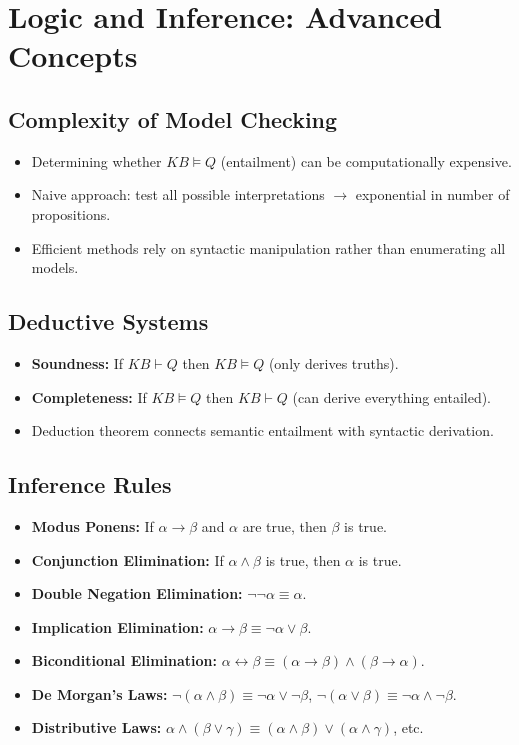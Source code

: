 \section{Logic and Inference: Advanced Concepts}

\subsection{Complexity of Model Checking}
\begin{itemize}
    \item Determining whether $KB \models Q$ (entailment) can be computationally expensive.
    \item Naive approach: test all possible interpretations $\rightarrow$ exponential in number of propositions.
    \item Efficient methods rely on syntactic manipulation rather than enumerating all models.
\end{itemize}

\subsection{Deductive Systems}
\begin{itemize}
    \item \textbf{Soundness:} If $KB \vdash Q$ then $KB \models Q$ (only derives truths).  
    \item \textbf{Completeness:} If $KB \models Q$ then $KB \vdash Q$ (can derive everything entailed).  
    \item Deduction theorem connects semantic entailment with syntactic derivation.
\end{itemize}

\subsection{Inference Rules}
\begin{itemize}
    \item \textbf{Modus Ponens:} If $\alpha \rightarrow \beta$ and $\alpha$ are true, then $\beta$ is true.
    \item \textbf{Conjunction Elimination:} If $\alpha \land \beta$ is true, then $\alpha$ is true.
    \item \textbf{Double Negation Elimination:} $\neg \neg \alpha \equiv \alpha$.
    \item \textbf{Implication Elimination:} $\alpha \rightarrow \beta \equiv \neg \alpha \lor \beta$.
    \item \textbf{Biconditional Elimination:} $\alpha \leftrightarrow \beta \equiv (\alpha \rightarrow \beta) \land (\beta \rightarrow \alpha)$.
    \item \textbf{De Morgan's Laws:} $\neg (\alpha \land \beta) \equiv \neg \alpha \lor \neg \beta$, $\neg (\alpha \lor \beta) \equiv \neg \alpha \land \neg \beta$.
    \item \textbf{Distributive Laws:} $\alpha \land (\beta \lor \gamma) \equiv (\alpha \land \beta) \lor (\alpha \land \gamma)$, etc.
\end{itemize}

